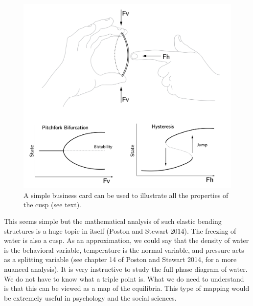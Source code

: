 \documentclass[
  a4paper,
  DIV=11,
  numbers=noendperiod,
  oneside]{scrreprt}
\begin{document}
\begin{figure}

{\centering \includegraphics{media/ch3/ch3-11__figure23.png}

}

\caption{\label{fig-ch3-img11-old-23}A simple business card can be used
to illustrate all the properties of the cusp (see text).}

\end{figure}

This seems simple but the mathematical analysis of such elastic bending
structures is a huge topic in itself (Poston and Stewart 2014). The
freezing of water is also a cusp. As an approximation, we could say that
the density of water is the behavioral variable, temperature is the
normal variable, and pressure acts as a splitting variable (see chapter
14 of Poston and Stewart 2014, for a more nuanced analysis). It is very
instructive to study the full phase diagram of water. We do not have to
know what a triple point is. What we do need to understand is that this
can be viewed as a map of the equilibria. This type of mapping would be
extremely useful in psychology and the social sciences.
\end{document}
